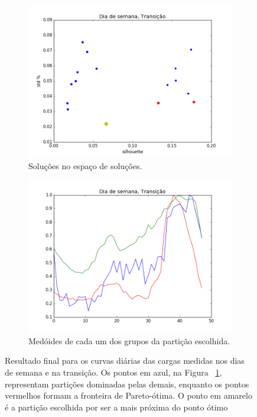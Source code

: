 \begin{figure}[!h]
	\centering
	\begin{subfigure}{.5\textwidth}
		\centering
		\includegraphics[width=.9\linewidth]{figuras/australia_5000/pareto_Dia_de_semana_Transicao.png}
		\caption{Soluções no espaço de soluções.}
		\label{fig:pareto_DDS_transicao}
	\end{subfigure}%
	\begin{subfigure}{.5\textwidth}
		\centering
		\includegraphics[width=.9\linewidth]{figuras/australia_5000/Dia_de_semana_Transicao.png}
		\caption{Medóides de cada um dos grupos da partição escolhida.}
		\label{fig:DDS_transicao}
	\end{subfigure}
	\caption{Resultado final para os curvas diárias das cargas medidas nos dias de semana e na transição. Os pontos em azul, na Figura ~\ref{fig:pareto_DDS_transicao}, representam partições dominadas pelas demais, enquanto os pontos vermelhos formam a fronteira de Pareto-ótima. O ponto em amarelo é a partição escolhida por ser a mais próxima do ponto ótimo}
	\label{fig:DDS_transicao_}
\end{figure}

